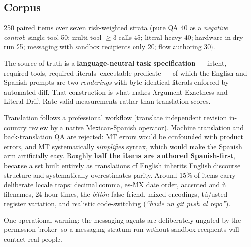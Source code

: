\subsection{Corpus}
\label{sec:corpus}

250 paired items over seven risk-weighted strata (pure QA 40 as a \emph{negative
control}; single-tool 50; multi-tool $\ge$3 calls 45; literal-heavy 40; hardware in
dry-run 25; messaging with sandbox recipients only 20; flow authoring 30).

The source of truth is a \textbf{language-neutral task specification} --- intent,
required tools, required literals, executable predicate --- of which the English and
Spanish prompts are two \emph{renderings} with byte-identical literals enforced by
automated diff. That construction is what makes Argument Exactness and Literal Drift
Rate valid measurements rather than translation scores.

Translation follows a professional workflow (translate \textrightarrow{} independent
revision \textrightarrow{} in-country review by a native Mexican-Spanish operator).
Machine translation and back-translation QA are rejected: MT errors would be confounded
with product errors, and MT systematically \emph{simplifies} syntax, which would make
the Spanish arm artificially easy. Roughly \textbf{half the items are authored
Spanish-first}, because a set built entirely as translations of English inherits
English discourse structure and systematically overestimates parity. Around 15\% of
items carry deliberate locale traps: decimal comma, es-MX date order, accented and ñ
filenames, 24-hour times, the \emph{billón} false friend, mixed encodings, tú/usted
register variation, and realistic code-switching
(\foreignlanguage{spanish}{\emph{``hazle un git push al repo''}}).

One operational warning: the messaging agents are deliberately ungated by the
permission broker, so a messaging stratum run without sandbox recipients will contact
real people.
